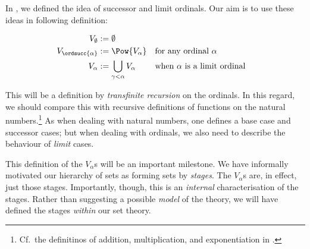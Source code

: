 \documentclass[../../../include/open-logic-section]{subfiles}
\begin{document}
In , we defined the idea of successor and limit ordinals. Our aim is to use these ideas in following definition:
\begin{defn}
	\begin{align*}
	V_\emptyset &:= \emptyset\\
	V_{\ordsucc{\alpha}} &:= \Pow{V_\alpha} & & \text{for any ordinal }\alpha\\
	V_{\alpha} &:= \bigcup_{\gamma < \alpha} V_\alpha & & \text{when }\alpha\text{ is a limit ordinal}
\end{align*}
\end{defn}\noindent
This will be a definition by \emph{transfinite recursion} on the ordinals. In this regard, we should compare this with recursive definitions of functions on the natural numbers.\footnote{Cf.\ the definitinos of addition, multiplication, and exponentiation in  .} As when dealing with natural numbers, one defines a base case and successor cases; but when dealing with ordinals, we also need to describe the behaviour of \emph{limit} cases. 

This definition of the $V_\alpha$s will be an important milestone. We have informally motivated our hierarchy of sets as forming sets by \emph{stages}. The $V_\alpha$s are, in effect, just those stages. Importantly, though, this is an \emph{internal} characterisation of the stages. Rather than suggesting a possible \emph{model} of the theory, we will have defined the stages \emph{within} our set theory.
\end{document}
